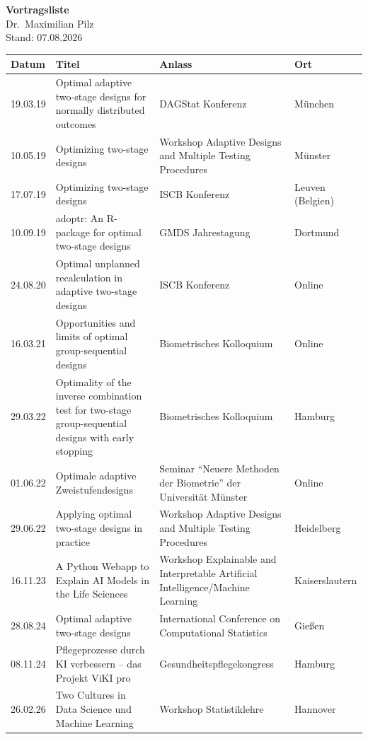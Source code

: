 \documentclass[a4paper,11pt]{article}
\begin{document}
\begin{center}
    {\Large \textbf{Vortragsliste}}\\[0.5em]
    Dr.\ Maximilian Pilz\\[0.5em]
    Stand: 07.08.2026
\end{center}

\vspace{1em}

\begin{longtable}{>{\raggedright}p{2cm} >{\raggedright}p{5cm} >{\raggedright}p{4.5cm} >{\raggedright\arraybackslash}p{3cm}}
    \textbf{Datum} & \textbf{Titel} & \textbf{Anlass} & \textbf{Ort} \\
    \hline
    \endhead
    19.03.19 & Optimal adaptive two-stage designs for normally distributed outcomes & DAGStat Konferenz & München \\[0.5em]
    10.05.19 & Optimizing two-stage designs & Workshop Adaptive Designs and Multiple Testing Procedures & Münster \\[0.5em]
    17.07.19 & Optimizing two-stage designs & ISCB Konferenz & Leuven (Belgien) \\[0.5em]
    10.09.19 & adoptr: An R-package for optimal two-stage designs & GMDS Jahrestagung & Dortmund \\[0.5em]
    24.08.20 & Optimal unplanned recalculation in adaptive two-stage designs & ISCB Konferenz & Online \\[0.5em]
    16.03.21 & Opportunities and limits of optimal group-sequential designs & Biometrisches Kolloquium & Online \\[0.5em]
    29.03.22 & Optimality of the inverse combination test for two-stage group-sequential designs with early stopping & Biometrisches Kolloquium & Hamburg \\[0.5em]
    01.06.22 & Optimale adaptive Zweistufendesigns & Seminar "`Neuere Methoden der Biometrie"' der Universität Münster & Online \\[0.5em]
    29.06.22 & Applying optimal two-stage designs in practice & Workshop Adaptive Designs and Multiple Testing Procedures & Heidelberg \\[0.5em]
    16.11.23 & A Python Webapp to Explain AI Models in the Life Sciences & Workshop Explainable and Interpretable Artificial Intelligence/Machine Learning & Kaiserslautern \\[0.5em]
    28.08.24 & Optimal adaptive two-stage designs & International Conference on Computational Statistics & Gießen \\[0.5em]
    08.11.24 & Pflegeprozesse durch KI verbessern -- das Projekt ViKI pro & Gesundheitspflegekongress & Hamburg \\
    26.02.26 & Two Cultures in Data Science und Machine Learning & Workshop Statistiklehre & Hannover
    \hline
\end{longtable}
\end{document}
